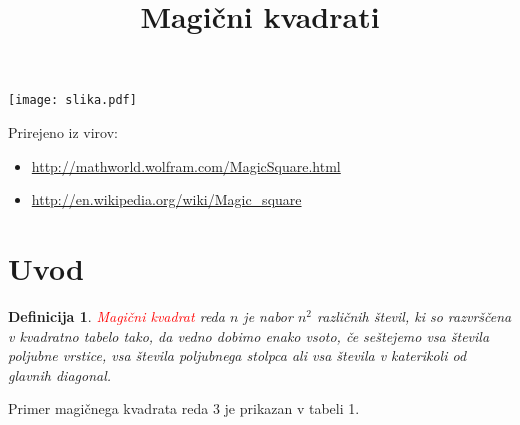 \documentclass[a4paper,12pt]{article}
\title{Magični kvadrati}
\date{}
\newtheorem{definition}{Definicija}
\begin{document}
\maketitle

\begin{center}
   \texttt{[image: slika.pdf]}
\end{center}
Prirejeno iz virov:

\begin{itemize}
   \item \url{http://mathworld.wolfram.com/MagicSquare.html}
   \item \url{http://en.wikipedia.org/wiki/Magic_square}
\end{itemize}

\tableofcontents

\newpage

\section{Uvod}

\begin{definition}
   \textcolor{red}{\emph{Magični kvadrat}} reda $n$ je nabor $n^2$ različnih števil,
   ki so razvrščena v kvadratno tabelo tako, da vedno dobimo enako vsoto,
   če seštejemo vsa števila poljubne vrstice, vsa števila poljubnega
   stolpca ali vsa števila v katerikoli od glavnih diagonal.
\end{definition}

Primer magičnega kvadrata reda 3 je prikazan v tabeli 1.
\end{document}
